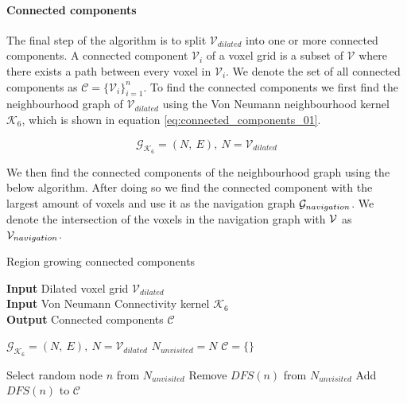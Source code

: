 \paragraph{Connected components}
The final step of the algorithm is to split \(\mathcal{V}_{dilated}\) into one or more connected components. A connected component \(\mathcal{V}_i\) of a voxel grid is a subset of \(\mathcal{V}\) where there exists a path between every voxel in \(\mathcal{V}_i\). We denote the set of all connected components as \(\mathcal{C}=\{\mathcal{V}_{i}\}_{i=1}^n\). To find the connected components we first find the neighbourhood graph of \(\mathcal{V}_{dilated}\) using the Von Neumann neighbourhood kernel \(\mathcal{K}_6\), which is shown in equation \ref{eq:connected_components_01}. 

\begin{equation}
    \label{eq:connected_components_01}
    \mathcal{G}_{\mathcal{K}_6} = (N,\ E),\ N = \mathcal{V}_{dilated}
\end{equation}

We then find the connected components of the neighbourhood graph using the below algorithm. After doing so we find the connected component with the largest amount of voxels and use it as the navigation graph \(\mathcal{G}_{navigation}\). We denote the intersection of the voxels in the navigation graph with \(\mathcal{V}\) as \(\mathcal{V}_{navigation}\).


\begin{algorithm}
    
    \caption{Region growing connected components}\label{alg:cap}
    \hspace*{\algorithmicindent} \textbf{Input} Dilated voxel grid \(\mathcal{V}_{dilated}\) \\
    \hspace*{\algorithmicindent} \textbf{Input} Von Neumann Connectivity kernel \(\mathcal{K}_6\) \\
    \hspace*{\algorithmicindent} \textbf{Output} Connected components \(\mathcal{C}\) \\

    \begin{algorithmic}
        \label{algo:connected}

    \State \(\mathcal{G}_{\mathcal{K}_6} = (N,\ E),\ N = \mathcal{V}_{dilated}\) 
    \State \(N_{unvisited} = N\)
    \State \(\mathcal{C} = \{\}\)
    
        \State Select random node \(n\) from \(N_{unvisited}\)
        \State Remove \(DFS(n)\) from \(N_{unvisited}\) 
        \State Add \(DFS(n)\) to \(\mathcal{C}\)
    \EndWhile
    \end{algorithmic}
\end{algorithm}

